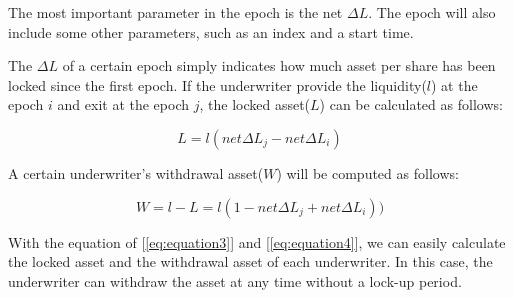 The most important parameter in the epoch is the net $\Delta L$.
The epoch will also include some other parameters, such as an index and a start time.

The $\Delta L$ of a certain epoch simply indicates how much asset per share has been locked since the first epoch.
If the underwriter provide the liquidity($l$) at the epoch $i$ and exit at the epoch $j$, the locked asset($L$) can be calculated as follows:

\begin{equation}
	L = l(net \Delta L_{j} - net \Delta L_{i})\label{eq:equation3}
\end{equation}

A certain underwriter's withdrawal asset($W$) will be computed as follows:

\begin{equation}
	W = l - L  = l(1- net \Delta L_{j} + net \Delta L_{i}))\label{eq:equation4}
\end{equation}

With the equation of [\ref{eq:equation3}] and [\ref{eq:equation4}], we can easily calculate the locked asset and the withdrawal asset of each underwriter.
In this case, the underwriter can withdraw the asset at any time without a lock-up period.
